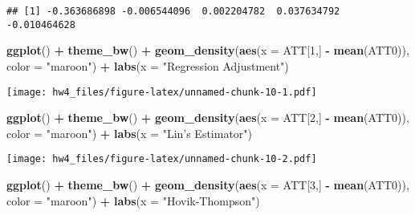 \documentclass[]{article}
\newenvironment{Shaded}{\begin{snugshade}}{\end{snugshade}}
\newcommand{\KeywordTok}[1]{\textcolor[rgb]{0.13,0.29,0.53}{\textbf{#1}}}
\newcommand{\DataTypeTok}[1]{\textcolor[rgb]{0.13,0.29,0.53}{#1}}
\newcommand{\DecValTok}[1]{\textcolor[rgb]{0.00,0.00,0.81}{#1}}
\newcommand{\StringTok}[1]{\textcolor[rgb]{0.31,0.60,0.02}{#1}}
\newcommand{\OperatorTok}[1]{\textcolor[rgb]{0.81,0.36,0.00}{\textbf{#1}}}
\newcommand{\NormalTok}[1]{#1}
\begin{document}
\begin{verbatim}
## [1] -0.363686898 -0.006544096  0.002204782  0.037634792 -0.010464628
\end{verbatim}

\begin{Shaded}
\begin{Highlighting}[]
\KeywordTok{ggplot}\NormalTok{() }\OperatorTok{+}\StringTok{ }\KeywordTok{theme_bw}\NormalTok{() }\OperatorTok{+}
\StringTok{  }\KeywordTok{geom_density}\NormalTok{(}\KeywordTok{aes}\NormalTok{(}\DataTypeTok{x =}\NormalTok{ ATT[}\DecValTok{1}\NormalTok{,] }\OperatorTok{-}\StringTok{ }\KeywordTok{mean}\NormalTok{(ATT0)), }\DataTypeTok{color =} \StringTok{"maroon"}\NormalTok{) }\OperatorTok{+}\StringTok{ }\KeywordTok{labs}\NormalTok{(}\DataTypeTok{x =} \StringTok{"Regression Adjustment"}\NormalTok{)}
\end{Highlighting}
\end{Shaded}

\texttt{[image: hw4\_files/figure-latex/unnamed-chunk-10-1.pdf]}

\begin{Shaded}
\begin{Highlighting}[]
\KeywordTok{ggplot}\NormalTok{() }\OperatorTok{+}\StringTok{ }\KeywordTok{theme_bw}\NormalTok{() }\OperatorTok{+}
\StringTok{  }\KeywordTok{geom_density}\NormalTok{(}\KeywordTok{aes}\NormalTok{(}\DataTypeTok{x =}\NormalTok{ ATT[}\DecValTok{2}\NormalTok{,] }\OperatorTok{-}\StringTok{ }\KeywordTok{mean}\NormalTok{(ATT0)), }\DataTypeTok{color =} \StringTok{"maroon"}\NormalTok{) }\OperatorTok{+}\StringTok{ }\KeywordTok{labs}\NormalTok{(}\DataTypeTok{x =} \StringTok{"Lin's Estimator"}\NormalTok{)}
\end{Highlighting}
\end{Shaded}

\texttt{[image: hw4\_files/figure-latex/unnamed-chunk-10-2.pdf]}

\begin{Shaded}
\begin{Highlighting}[]
\KeywordTok{ggplot}\NormalTok{() }\OperatorTok{+}\StringTok{ }\KeywordTok{theme_bw}\NormalTok{() }\OperatorTok{+}
\StringTok{  }\KeywordTok{geom_density}\NormalTok{(}\KeywordTok{aes}\NormalTok{(}\DataTypeTok{x =}\NormalTok{ ATT[}\DecValTok{3}\NormalTok{,] }\OperatorTok{-}\StringTok{ }\KeywordTok{mean}\NormalTok{(ATT0)), }\DataTypeTok{color =} \StringTok{"maroon"}\NormalTok{) }\OperatorTok{+}\StringTok{ }\KeywordTok{labs}\NormalTok{(}\DataTypeTok{x =} \StringTok{"Hovik-Thompson"}\NormalTok{)}
\end{Highlighting}
\end{Shaded}
\end{document}
